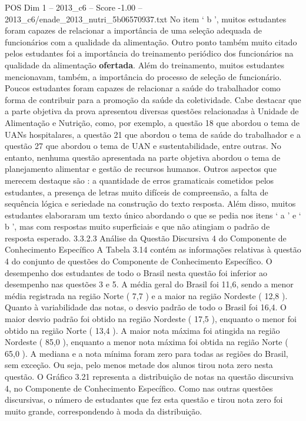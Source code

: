 \begin{textsample}{POS Dim 1 – 2013\_c6 – Score -1.00 – 2013\_c6/enade\_2013\_nutri\_5b06570937.txt}
No item ‘ b ’, muitos estudantes foram capazes de relacionar a importância de uma seleção adequada de funcionários com a qualidade da alimentação.
Outro ponto também muito citado pelos estudantes foi a importância do treinamento periódico dos funcionários na qualidade da alimentação \textbf{ofertada}.
Além do treinamento, muitos estudantes mencionavam, também, a importância do processo de seleção de funcionário.
Poucos estudantes foram capazes de relacionar a saúde do trabalhador como forma de contribuir para a promoção da saúde da coletividade.
Cabe destacar que a parte objetiva da prova apresentou diversas questões relacionadas à Unidade de Alimentação e Nutrição, como, por exemplo, a questão 18 que abordou o tema de UANs hospitalares, a questão 21 que abordou o tema de saúde do trabalhador e a questão 27 que abordou o tema de UAN e sustentabilidade, entre outras.
No entanto, nenhuma questão apresentada na parte objetiva abordou o tema de planejamento alimentar e gestão de recursos humanos.
Outros aspectos que merecem destaque são : a quantidade de erros gramaticais cometidos pelos estudantes, a presença de letras muito difíceis de compreensão, a falta de sequência lógica e seriedade na construção do texto resposta.
Além disso, muitos estudantes elaboraram um texto único abordando o que se pedia nos itens ‘ a ’ e ‘ b ’, mas com respostas muito superficiais e que não atingiam o padrão de resposta esperado. 3.3.2.3 Análise da Questão Discursiva 4 do Componente de Conhecimento Específico A Tabela 3.14 contém as informações relativas à questão 4 do conjunto de questões do Componente de Conhecimento Específico.
O desempenho dos estudantes de todo o Brasil nesta questão foi inferior ao desempenho nas questões 3 e 5.
A média geral do Brasil foi 11,6, sendo a menor média registrada na região Norte ( 7,7 ) e a maior na região Nordeste ( 12,8 ).
Quanto à variabilidade das notas, o desvio padrão de todo o Brasil foi 16,4.
O maior desvio padrão foi obtido na região Nordeste ( 17,5 ), enquanto o menor foi obtido na região Norte ( 13,4 ).
A maior nota máxima foi atingida na região Nordeste ( 85,0 ), enquanto a menor nota máxima foi obtida na região Norte ( 65,0 ).
A mediana e a nota mínima foram zero para todas as regiões do Brasil, sem exceção.
Ou seja, pelo menos metade dos alunos tirou nota zero nesta questão.
O Gráfico 3.21 representa a distribuição de notas na questão discursiva 4, no Componente de Conhecimento Específico.
Como nas outras questões discursivas, o número de estudantes que fez esta questão e tirou nota zero foi muito grande, correspondendo à moda da distribuição.

\end{textsample}
